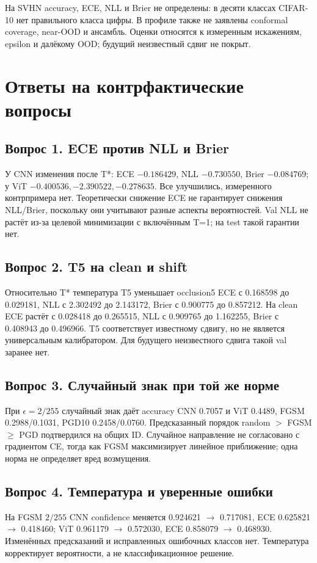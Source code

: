 На SVHN accuracy, ECE, NLL и Brier не определены: в десяти классах CIFAR-10 нет правильного класса цифры. В профиле также не заявлены conformal coverage, near-OOD и ансамбль. Оценки относятся к измеренным искажениям, epsilon и далёкому OOD; будущий неизвестный сдвиг не покрыт.

\section{Ответы на контрфактические вопросы}
\subsection*{Вопрос 1. ECE против NLL и Brier}
У CNN изменения после T*: ECE $-0.186429$, NLL $-0.730550$, Brier $-0.084769$; у ViT $-0.400536,-2.390522,-0.278635$. Все улучшились, измеренного контрпримера нет. Теоретически снижение ECE не гарантирует снижения NLL/Brier, поскольку они учитывают разные аспекты вероятностей. Val NLL не растёт из-за целевой минимизации с включённым T=1; на test такой гарантии нет.
\subsection*{Вопрос 2. T5 на clean и shift}
Относительно T* температура T5 уменьшает occlusion5 ECE с 0.168598 до 0.029181, NLL с 2.302492 до 2.143172, Brier с 0.900775 до 0.857212. На clean ECE растёт с 0.028418 до 0.265515, NLL с 0.909765 до 1.162255, Brier с 0.408943 до 0.496966. T5 соответствует известному сдвигу, но не является универсальным калибратором. Для будущего неизвестного сдвига такой val заранее нет.
\subsection*{Вопрос 3. Случайный знак при той же норме}
При $\epsilon=2/255$ случайный знак даёт accuracy CNN 0.7057 и ViT 0.4489, FGSM 0.2988/0.1031, PGD10 0.2458/0.0760. Предсказанный порядок random $>$ FGSM $\ge$ PGD подтвердился на общих ID. Случайное направление не согласовано с градиентом CE, тогда как FGSM максимизирует линейное приближение; одна норма не определяет вред возмущения.
\subsection*{Вопрос 4. Температура и уверенные ошибки}
На FGSM $2/255$ CNN confidence меняется 0.924621 $\to$ 0.717081, ECE 0.625821 $\to$ 0.418460; ViT 0.961179 $\to$ 0.572030, ECE 0.858079 $\to$ 0.468930. Изменённых предсказаний и исправленных ошибочных классов нет. Температура корректирует вероятности, а не классификационное решение.
